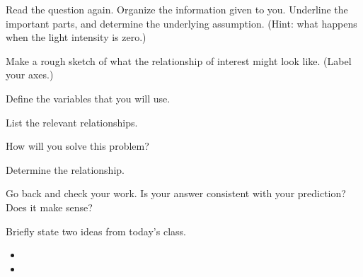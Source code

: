 \begin{problem}
      \begin{subproblem}
      \item Read the question again. Organize the information given to
        you. Underline the important parts, and determine the underlying
        assumption. (Hint: what happens when the light intensity is
        zero.)
        \vfill
      \item Make a rough sketch of what the relationship of interest
        might look like. (Label your axes.)
        \vfill
      \item Define the variables that you will use.
        \vspace{2em}
      \item List the relevant relationships.
        \vfill
      \item How will you solve this problem?
        \vfill
      \item Determine the relationship.
        \vfill
      \item Go back and check your work. Is your answer consistent
        with your prediction? Does it make sense?
      \end{subproblem}

\end{problem}

\postClass

\begin{problem}
\item Briefly state two ideas from today's class.
  \begin{itemize}
  \item 
  \item 
  \end{itemize}
\item 
  \begin{subproblem}
    \item
  \end{subproblem}
\end{problem}




